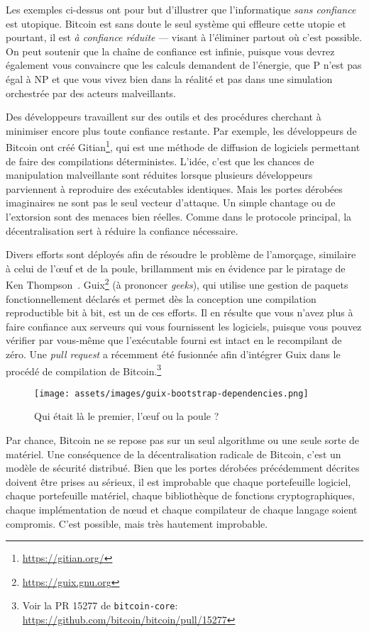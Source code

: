 Les exemples ci-dessus ont pour but d'illustrer que l'informatique \textit{sans
confiance} est utopique. Bitcoin est sans doute le seul système qui effleure
cette utopie et pourtant, il est \textit{à confiance réduite} --- visant à
l'éliminer partout où c'est possible. On peut soutenir que la chaîne de
confiance est infinie, puisque vous devrez également vous convaincre que les
calculs demandent de l'énergie, que P n'est pas égal à NP et que vous vivez bien
dans la réalité et pas dans une simulation orchestrée par des acteurs
malveillants.

Des développeurs travaillent sur des outils et des procédures cherchant à
minimiser encore plus toute confiance restante. Par exemple, les développeurs de
Bitcoin ont créé Gitian\footnote{\url{https://gitian.org/}}, qui est une méthode
de diffusion de logiciels permettant de faire des compilations déterministes.
L'idée, c'est que les chances de manipulation malveillante sont réduites lorsque
plusieurs développeurs parviennent à reproduire des exécutables identiques. Mais
les portes dérobées imaginaires ne sont pas le seul vecteur d'attaque. Un simple
chantage ou de l'extorsion sont des menaces bien réelles. Comme dans le
protocole principal, la décentralisation sert à réduire la confiance nécessaire.

Divers efforts sont déployés afin de résoudre le problème de l'amorçage,
similaire à celui de l'œuf et de la poule, brillamment mis en évidence par le
piratage de Ken Thompson~\cite{web:bootstrapping}.
Guix\footnote{\url{https://guix.gnu.org}} (à prononcer \textit{geeks}), qui
utilise une gestion de paquets fonctionnellement déclarés et permet dès la
conception une compilation reproductible bit à bit, est un de ces efforts. Il en
résulte que vous n'avez plus à faire confiance aux serveurs qui vous fournissent
les logiciels, puisque vous pouvez vérifier par vous-même que l'exécutable
fourni est intact en le recompilant de zéro. Une \textit{pull request} a
récemment été fusionnée afin d'intégrer Guix dans le procédé de compilation de
Bitcoin.\footnote{Voir la PR 15277 de \texttt{bitcoin-core}: \\
\url{https://github.com/bitcoin/bitcoin/pull/15277}}

\begin{figure}
  \texttt{[image: assets/images/guix-bootstrap-dependencies.png]}
  \caption{Qui était là le premier, l'œuf ou la poule ?}
  \label{fig:guix-bootstrap-dependencies}
\end{figure}

Par chance, Bitcoin ne se repose pas sur un seul algorithme ou une seule sorte
de matériel. Une conséquence de la décentralisation radicale de Bitcoin, c'est
un modèle de sécurité distribué. Bien que les portes dérobées précédemment
décrites doivent être prises au sérieux, il est improbable que chaque
portefeuille logiciel, chaque portefeuille matériel, chaque bibliothèque de
fonctions cryptographiques, chaque implémentation de nœud et chaque compilateur
de chaque langage soient compromis. C'est possible, mais très hautement
improbable.

